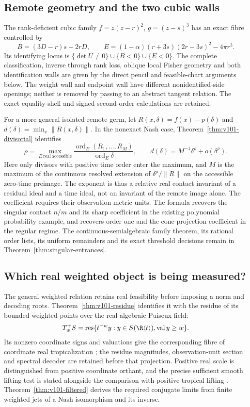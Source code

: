 \subsection*{Remote geometry and the two cubic walls}
The rank-deficient cubic family $f=z(z-r)^2$, $g=(z-s)^3$ has an exact
fibre controlled by
\[
 B=(3D-r)s-2rD,\qquad
 E=(1-\alpha)(r+3s)(2r-3s)^2-4\pi r^3.
\]
Its identifying locus is
$\{\det U\ne0\}\cup\{B<0\}\cup\{E<0\}$.
The complete classification, inverse through rank loss, oblique local
Fisher geometry and both identification walls are given by the direct
pencil and feasible-chart arguments below. The weight wall and endpoint
wall have different nonidentified-side openings; neither is removed by
passing to an abstract tangent relation. The exact equality-shell and
signed second-order calculations are retained.

For a more general isolated remote germ, let
$R(x,\delta)=f(x)-p(\delta)$ and
$d(\delta)=\min_x\|R(x,\delta)\|$. In the nonexact Nash case,
Theorem~\ref{thm:v101-divisorial} identifies
\[
 \rho=\max_{E\ \mathrm{real\ accessible}}
              \frac{\operatorname{ord}_E(R_1,\ldots,R_M)}
                   {\operatorname{ord}_E\delta},\qquad
 d(\delta)=M^{-1}\delta^\rho+o(\delta^\rho).
\]
Here only divisors with positive time order enter the maximum, and
$M$ is the maximum of the continuous resolved extension of
$\delta^\rho/\|R\|$ on the accessible zero-time preimage.
The exponent is thus a relative real contact invariant of a residual
ideal and a time ideal, not an invariant of the remote image alone.
The coefficient requires their observation-metric units. The formula
recovers the singular contact $n/m$ and its sharp coefficient in the
existing polynomial probability example, and recovers order one and
the cone-projection coefficient in the regular regime.
The continuous-semialgebraic family theorem, its rational order lists,
its uniform remainders and its exact threshold decisions remain in
Theorem~\ref{thm:singular-entrances}.

\subsection*{Which real weighted object is being measured?}
The general weighted relation retains real feasibility before imposing
a norm and decoding roots. Theorem~\ref{thm:v101-residue} identifies
it with the residue of its bounded weighted points over the real
algebraic Puiseux field:
\[
 T_w^+S=\operatorname{res}\{t^{-w}y:y\in S(\R\langle t\rangle),
                                      \operatorname{val}y\ge w\}.
\]
Its nonzero coordinate signs and valuations give the corresponding
fibre of coordinate real tropicalization \cite{A2JSY22}; the residue
magnitudes, observation-unit section and spectral decoder are retained
before that projection. Positive real scale is distinguished from
positive coordinate orthant, and the precise sufficient smooth lifting
test is stated alongside the comparison with positive tropical
lifting \cite{A2RT26}. Theorem~\ref{thm:v101-filtered} derives the
required conjugate limits from finite weighted jets of a Nash
isomorphism and its inverse.

